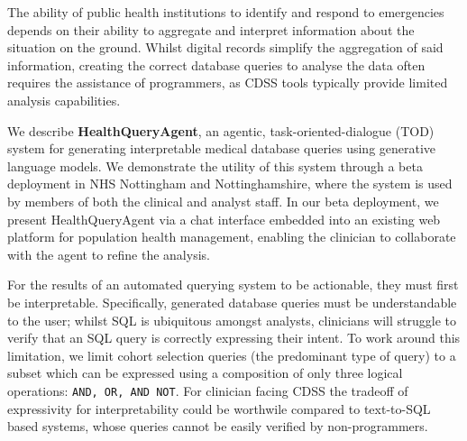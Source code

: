 \documentclass[11pt]{article}
\begin{document}

The ability of public health institutions to identify and respond to emergencies depends on their ability to aggregate and interpret information about the situation on the ground. Whilst digital records simplify the aggregation of said information, creating the correct database queries to analyse the data often requires the assistance of programmers, as CDSS tools typically provide limited analysis capabilities.



We describe \textbf{HealthQueryAgent}, an agentic, task-oriented-dialogue (TOD) system for generating interpretable medical database queries using generative language models. We demonstrate the utility of this system through a beta deployment in NHS Nottingham and Nottinghamshire, where the system is used by members of both the clinical and analyst staff.
In our beta deployment, we present HealthQueryAgent via a chat interface embedded into an existing web platform for population health management, enabling the clinician to collaborate with the agent to refine the analysis. %

For the results of an automated querying system to be actionable, they must first be interpretable. Specifically, generated database queries must be understandable to the user; whilst SQL is ubiquitous amongst analysts, clinicians will struggle to verify that an SQL query is correctly expressing their intent. To work around this limitation, we limit cohort selection queries (the predominant type of query) to a subset which can be expressed using a composition of only three logical operations: \texttt{AND, OR, AND NOT}. For clinician facing CDSS the tradeoff of expressivity for interpretability could be worthwile compared to text-to-SQL based systems, whose queries cannot be easily verified by non-programmers.


\end{document}
